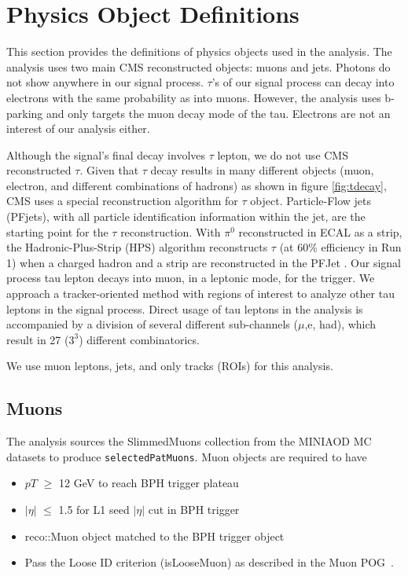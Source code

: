 \clearpage
\chapter{Physics Object Definitions}\label{sec:objects}

This section provides the definitions of physics objects used in the analysis.
The analysis uses two main CMS reconstructed objects: muons and jets.
Photons do not show anywhere in our signal process.
$\tau$'s of our signal process can decay into electrons with the same probability as into muons.
However, the analysis uses b-parking and only targets the muon decay mode of the tau.
Electrons are not an interest of our analysis either.

Although the signal's final decay involves $\tau$ lepton, we do not use CMS reconstructed $\tau$.
Given that $\tau$ decay results in many different objects (muon, electron, and different combinations of hadrons) as shown in figure \ref{fig:tdecay}, CMS uses a special reconstruction algorithm for $\tau$ object.
Particle-Flow jets (PFjets), with all particle identification information within the jet, are the starting point for the $\tau$ reconstruction.
With $\pi^{0}$ reconstructed in ECAL as a strip, the Hadronic-Plus-Strip (HPS) algorithm reconstructs $\tau$ (at 60\% efficiency in Run 1) when a charged hadron and a strip are reconstructed in the PFJet \cite{HPS}.
Our signal process tau lepton decays into muon, in a leptonic mode, for the trigger.
We approach a tracker-oriented method with regions of interest to analyze other tau leptons in the signal process.
Direct usage of tau leptons in the analysis is accompanied by a division of several different sub-channels ($\mu$,e, had), which result in 27 ($3^{3}$) different combinatorics.

We use muon leptons, jets, and only tracks (ROIs) for this analysis.
\section{Muons}\label{sec:muons}
The analysis sources the SlimmedMuons collection from the MINIAOD MC datasets to produce {\tt selectedPatMuons}.
Muon objects are required to have 
\begin{itemize}
  \item $pT$ $\geq$ 12 GeV to reach BPH trigger plateau
  \item $|\eta|$ $\leq$ 1.5 for L1 seed $|\eta|$ cut in BPH trigger
  \item reco::Muon object matched to the BPH trigger object
  \item Pass the Loose ID criterion (isLooseMuon) as described in the Muon POG~\cite{muonpog}.
\end{itemize}

